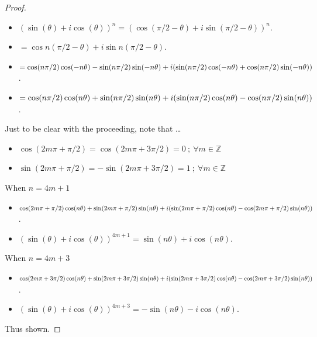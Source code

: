 \documentclass[12pt]{article}
\newcommand{\ds}{\displaystyle}
\theoremstyle{plain}
\begin{document}
\begin{proof}
  \ \\

  \begin{itemize}
    \item $ \ds (\sin(\theta) + i\cos(\theta))^{n} = (\cos(\pi/2 - \theta) + i\sin(\pi/2 - \theta))^{n} $.
    \item $ \ds = \cos{n(\pi/2 - \theta)} + i\sin{n(\pi/2 - \theta)} $.
    \item $ \ds = \cos(n\pi/2)\cos(-n\theta) - \sin(n\pi/2)\sin(-n\theta) + \\ i(\sin(n\pi/2)\cos(-n\theta) + \cos(n\pi/2)\sin(-n\theta)) $.
    \item $ \ds = \cos(n\pi/2)\cos(n\theta) + \sin(n\pi/2)\sin(n\theta) + \\ i(\sin(n\pi/2)\cos(n\theta) - \cos(n\pi/2)\sin(n\theta)) $.
  \end{itemize}

  Just to be clear with the proceeding, note that \dots

  \begin{itemize}
    \item $ \ds \cos(2m\pi + \pi/2) = \cos(2m\pi + 3\pi/2) = 0 \ ; \ \forall m \in \mathbb{Z} $
    \item $ \ds \sin(2m\pi + \pi/2) = -\sin(2m\pi + 3\pi/2) = 1 \ ; \ \forall m \in \mathbb{Z} $
\end{itemize}

  When $ n = 4m + 1 $
  \begin{itemize}
    \item $ \ds \cos(2m\pi + \pi/2)\cos(n\theta) + \sin(2m\pi + \pi/2)\sin(n\theta) + \\ i(\sin(2m\pi + \pi/2)\cos(n\theta) - \cos(2m\pi + \pi/2)\sin(n\theta)) $.
    \item $ \ds (\sin(\theta) + i\cos(\theta))^{4m + 1} = \sin(n\theta) + i\cos(n\theta) $.
  \end{itemize}

  When $ n = 4m + 3 $
  \begin{itemize}
    \item $ \ds \cos(2m\pi + 3\pi/2)\cos(n\theta) + \sin(2m\pi + 3\pi/2)\sin(n\theta) + \\ i(\sin(2m\pi + 3\pi/2)\cos(n\theta) - \cos(2m\pi + 3\pi/2)\sin(n\theta)) $.
    \item $ \ds (\sin(\theta) + i\cos(\theta))^{4m + 3} = -\sin(n\theta) - i\cos(n\theta) $.
  \end{itemize}

  Thus shown.

\end{proof}
\end{document}
